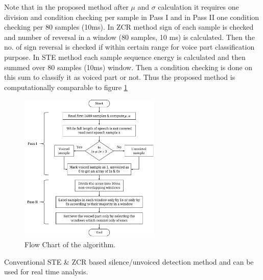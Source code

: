 \documentclass[12pt, a4paper, twoside]{report}
\begin{document}
Note that in the proposed method after $\mu$ and $\sigma$ calculation it requires one division and condition checking per sample in Pass I and in Pass II one condition checking per 80 samples (10ms). In ZCR method sign of each sample is checked and number of reversal in a window (80 samples, 10 ms) is calculated. Then the no. of sign reversal is checked if within certain range for voice part classification purpose. In STE method each sample sequence energy is calculated and then summed over 80 samples (10ms) window. Then a condition checking is done on this sum to classify it as voiced part or not. Thus the proposed method is computationally comparable to figure \ref{fig:s-remove-algorithm}

\begin{figure}[!h]
	\centering
	\includegraphics[width=0.6\textwidth]
	{images/chapter2/s-remove-algorithm}
	\caption{Flow Chart of the algorithm.}
	\label{fig:s-remove-algorithm}
\end{figure}

Conventional STE \& ZCR based silence/unvoiced detection method and can be used for real time analysis.
\end{document}
